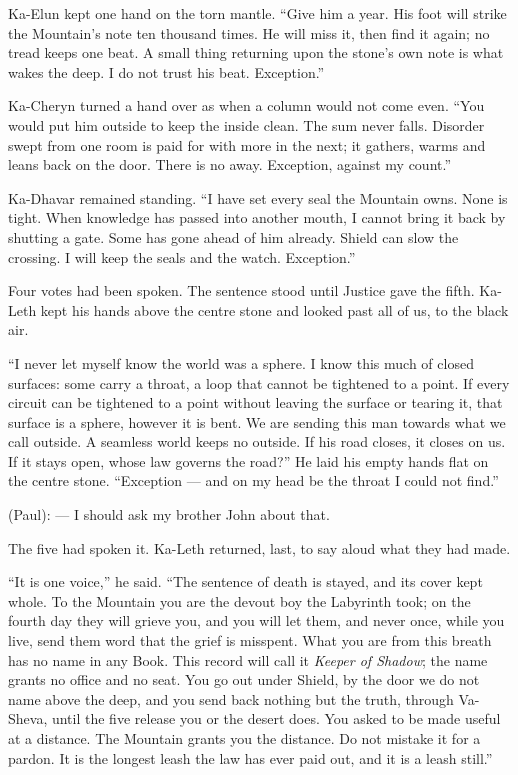 Ka-Elun kept one hand on the torn mantle. ``Give him a year. His foot will strike the Mountain's note ten thousand times. He will miss it, then find it again; no tread keeps one beat. A small thing returning upon the stone's own note is what wakes the deep. I do not trust his beat. Exception.''\par

Ka-Cheryn turned a hand over as when a column would not come even. ``You would put him outside to keep the inside clean. The sum never falls. Disorder swept from one room is paid for with more in the next; it gathers, warms and leans back on the door. There is no away. Exception, against my count.''\par

Ka-Dhavar remained standing. ``I have set every seal the Mountain owns. None is tight. When knowledge has passed into another mouth, I cannot bring it back by shutting a gate. Some has gone ahead of him already. Shield can slow the crossing. I will keep the seals and the watch. Exception.''\par

Four votes had been spoken. The sentence stood until Justice gave the fifth. Ka-Leth kept his hands above the centre stone and looked past all of us, to the black air.\par

``I never let myself know the world was a sphere. I know this much of closed surfaces: some carry a throat, a loop that cannot be tightened to a point. If every circuit can be tightened to a point without leaving the surface or tearing it, that surface is a sphere, however it is bent. We are sending this man towards what we call outside. A seamless world keeps no outside. If his road closes, it closes on us. If it stays open, whose law governs the road?'' He laid his empty hands flat on the centre stone. ``Exception --- and on my head be the throat I could not find.''\par

\begin{room}

(Paul): --- I should ask my brother John about that.
\end{room}

The five had spoken it. Ka-Leth returned, last, to say aloud what they had made.\par

``It is one voice,'' he said. ``The sentence of death is stayed, and its cover kept whole. To the Mountain you are the devout boy the Labyrinth took; on the fourth day they will grieve you, and you will let them, and never once, while you live, send them word that the grief is misspent. What you are from this breath has no name in any Book. This record will call it \textit{Keeper of Shadow}; the name grants no office and no seat. You go out under Shield, by the door we do not name above the deep, and you send back nothing but the truth, through Va-Sheva, until the five release you or the desert does. You asked to be made useful at a distance. The Mountain grants you the distance. Do not mistake it for a pardon. It is the longest leash the law has ever paid out, and it is a leash still.''\par

